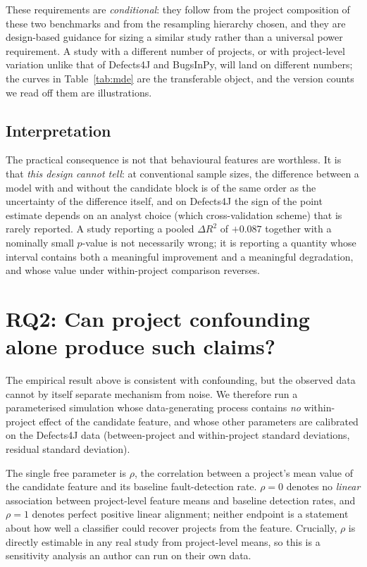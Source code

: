 \documentclass[preprint,12pt]{elsarticle}
\begin{document}
These requirements are \emph{conditional}: they follow from the project
composition of these two benchmarks and from the resampling hierarchy
chosen, and they are design-based guidance for sizing a similar study
rather than a universal power requirement. A study with a different number
of projects, or with project-level variation unlike that of Defects4J and
BugsInPy, will land on different numbers; the curves in
Table~\ref{tab:mde} are the transferable object, and the version counts we
read off them are illustrations.

\subsection{Interpretation}

The practical consequence is not that behavioural features are worthless.
It is that \emph{this design cannot tell}: at conventional sample sizes,
the difference between a model with and without the candidate block is of
the same order as the uncertainty of the difference itself, and on
Defects4J the sign of the point estimate depends on an analyst choice
(which cross-validation scheme) that is rarely reported. A study reporting
a pooled $\Delta R^2$ of $+0.087$ together with a nominally small
$p$-value is not necessarily wrong; it is reporting a quantity whose
interval contains both a meaningful improvement and a meaningful
degradation, and whose value under within-project comparison reverses.

\section{RQ2: Can project confounding alone produce such claims?}
\label{sec:rq2}

The empirical result above is consistent with confounding, but the
observed data cannot by itself separate mechanism from noise. We therefore
run a parameterised simulation whose data-generating process contains
\emph{no} within-project effect of the candidate feature, and whose other
parameters are calibrated on the Defects4J data (between-project and
within-project standard deviations, residual standard deviation).

The single free parameter is $\rho$, the correlation between a project's
mean value of the candidate feature and its baseline fault-detection rate.
$\rho = 0$ denotes no \emph{linear}
association between project-level feature means and baseline detection
rates, and $\rho = 1$ denotes perfect positive linear alignment; neither
endpoint is a statement about how well a classifier could recover projects
from the feature. Crucially, $\rho$ is directly
estimable in any real study from project-level means, so this is a
sensitivity analysis an author can run on their own data.
\end{document}
